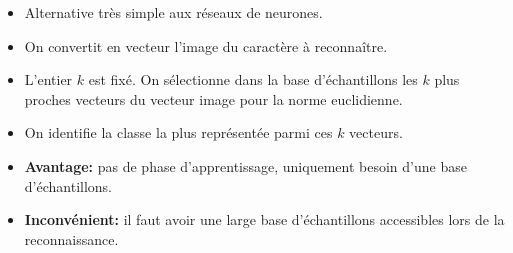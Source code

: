 \clearpage
{}

\begin{slide}

	\begin{itemize}

		\item Alternative très simple aux réseaux de neurones.

		\item On convertit en vecteur l'image du caractère à reconnaître.

		\item L'entier $k$ est fixé. On sélectionne dans la base d'échantillons les $k$ plus proches vecteurs du vecteur image pour la norme euclidienne.

		\item On identifie la classe la plus représentée parmi ces $k$ vecteurs. 

		\item \textbf{Avantage:} pas de phase d'apprentissage, uniquement besoin d'une base d'échantillons.
		\item \textbf{Inconvénient:} il faut avoir une large base d'échantillons accessibles lors de la reconnaissance.

	\end{itemize}

\end{slide}